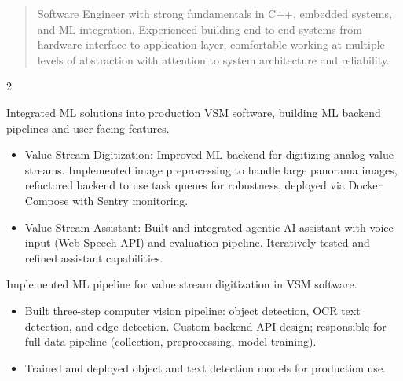 \documentclass[10pt,a4paper,ragged2e,withhyper]{altacv}
\author{Andreas Loehr}
\date{\today}
\title{}
\begin{document}
\makecvheader
\vspace{0.2cm}
 \begin{quote}
 Software Engineer with strong fundamentals in C++, embedded systems, and ML integration. Experienced building end-to-end systems from hardware interface to application layer; comfortable working at multiple levels of abstraction with attention to system architecture and reliability.
 \end{quote}
\vspace{0.2cm}
\begin{paracol}{2}
\label{sec:org86b947a}

Integrated ML solutions into production VSM software, building ML backend pipelines and user-facing features.

\begin{itemize}
\item Value Stream Digitization: Improved ML backend for digitizing analog value streams. Implemented image preprocessing to handle large panorama images, refactored backend to use task queues for robustness, deployed via Docker Compose with Sentry monitoring.
\item Value Stream Assistant: Built and integrated agentic AI assistant with voice input (Web Speech API) and evaluation pipeline. Iteratively tested and refined assistant capabilities.
\end{itemize}

\par\divider


Implemented ML pipeline for value stream digitization in VSM software.

\begin{itemize}
\item Built three-step computer vision pipeline: object detection, OCR text detection, and edge detection. Custom backend API design; responsible for full data pipeline (collection, preprocessing, model training).
\item Trained and deployed object and text detection models for production use.
\end{itemize}


\end{paracol}
\end{document}
